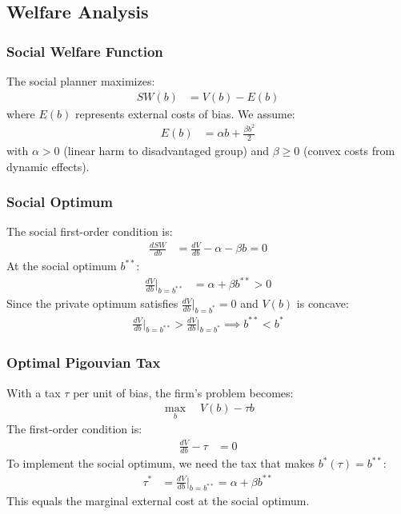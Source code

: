 \documentclass[12pt,a4paper]{article}
\theoremstyle{definition}
\theoremstyle{remark}
\begin{document}
\subsection{Welfare Analysis}

\subsubsection{Social Welfare Function}
The social planner maximizes:
\begin{align}
SW(b) &= V(b) - E(b)
\end{align}
where $E(b)$ represents external costs of bias. We assume:
\begin{align}
E(b) &= \alpha b + \frac{\beta b^2}{2}
\end{align}
with $\alpha > 0$ (linear harm to disadvantaged group) and $\beta \geq 0$ (convex costs from dynamic effects).

\subsubsection{Social Optimum}
The social first-order condition is:
\begin{align}
\frac{dSW}{db} &= \frac{dV}{db} - \alpha - \beta b = 0 \label{eq:social_foc}
\end{align}
At the social optimum $b^{**}$:
\begin{align}
\frac{dV}{db}\bigg|_{b=b^{**}} &= \alpha + \beta b^{**} > 0
\end{align}
Since the private optimum satisfies $\frac{dV}{db}\big|_{b=b^*} = 0$ and $V(b)$ is concave:
\begin{align}
\frac{dV}{db}\bigg|_{b=b^{**}} > \frac{dV}{db}\bigg|_{b=b^*} \implies b^{**} < b^*
\end{align}

\subsubsection{Optimal Pigouvian Tax}
With a tax $\tau$ per unit of bias, the firm's problem becomes:
\begin{align}
\max_b \quad V(b) - \tau b
\end{align}
The first-order condition is:
\begin{align}
\frac{dV}{db} - \tau &= 0
\end{align}
To implement the social optimum, we need the tax that makes $b^*(\tau) = b^{**}$:
\begin{align}
\tau^* &= \frac{dV}{db}\bigg|_{b=b^{**}} = \alpha + \beta b^{**}
\end{align}
This equals the marginal external cost at the social optimum.
\end{document}
